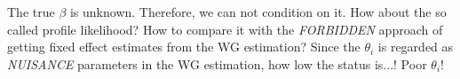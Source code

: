 \begin{question}
    The true $\beta$ is unknown. Therefore, we can not condition on it. How about the so called profile likelihood? How to compare it with the \textit{FORBIDDEN} approach of getting fixed effect estimates from the WG estimation? Since the $\theta_i$ is regarded as \textit{NUISANCE} parameters in the WG estimation, how low the status is...! Poor $\theta_i$!
\end{question}



